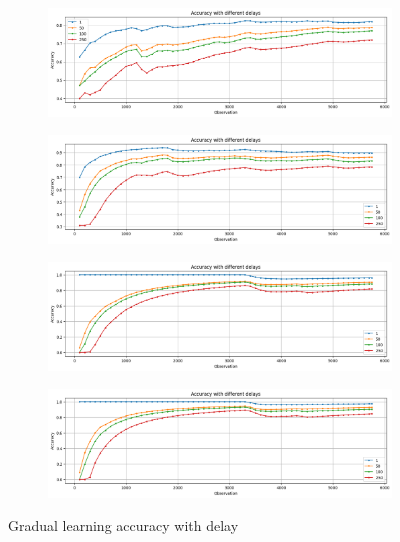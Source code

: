 \begin{figure}[ht]
    \centering
    \begin{subfigure}[b]{0.49\textwidth}
        \includegraphics[width=\textwidth]{assets/design/gradual-learning-accuracy-delay-temporal-domain-fault.png}
        \caption{}
    \end{subfigure}
    \hfill
    \begin{subfigure}[b]{0.49\textwidth}
        \includegraphics[width=\textwidth]{assets/design/gradual-learning-accuracy-delay-spectral-domain-fault.png}
        \caption{}
    \end{subfigure}
    \begin{subfigure}[b]{0.49\textwidth}
        \includegraphics[width=\textwidth]{assets/design/gradual-learning-accuracy-delay-temporal-domain-anomaly60.png}
        \caption{}
    \end{subfigure}
    \hfill
    \begin{subfigure}[b]{0.49\textwidth}
        \includegraphics[width=\textwidth]{assets/design/gradual-learning-accuracy-delay-spectral-domain-anomaly60.png}
        \caption{}
    \end{subfigure}
    \caption{Gradual learning accuracy with delay}
\end{figure}



